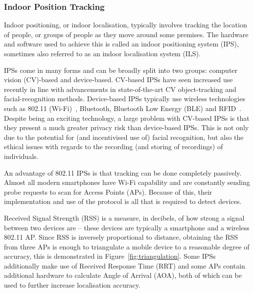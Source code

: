 \subsubsection{Indoor Position Tracking}\label{sec:indoor-position-tracking}

Indoor positioning, or indoor localisation, typically involves tracking the location of people, or groups of people as they move around some premises.
The hardware and software used to achieve this is called an indoor positioning system (IPS), sometimes also referred to as an indoor localisation system (ILS).

IPSs come in many forms and can be broadly split into two groups: computer vision (CV)-based and device-based.
CV-based IPSs have seen increased use recently in line with advancements in state-of-the-art CV object-tracking and facial-recognition methods.
Device-based IPSs typically use wireless technologies such as 802.11 (Wi-Fi)~\cite{ieee1997}, Bluetooth, Bluetooth Low Energy (BLE) and RFID~\cite{S.Shen2020}.
Despite being an exciting technology, a large problem with CV-based IPSs is that they present a much greater privacy risk than device-based IPSs.
This is not only due to the potential for (and incentivised use of) facial recognition, but also the ethical issues with regards to the recording (and storing of recordings) of individuals.

An advantage of 802.11 IPSs is that tracking can be done completely passively.
Almost all modern smartphones have Wi-Fi capability and are constantly sending probe requests to scan for Access Points (APs).
Because of this, their implementation and use of the protocol is all that is required to detect devices.

Received Signal Strength (RSS) is a measure, in decibels, of how strong a signal between two devices are -- these devices are typically a smartphone and a wireless 802.11 AP.
Since RSS is inversely proportional to distance, obtaining the RSS from three APs is enough to triangulate a mobile device to a reasonable degree of accuracy, this is demonstrated in Figure~\ref{fig:triangulation}.
Some IPSs additionally make use of Received Response Time (RRT) and some APs contain additional hardware to calculate Angle of Arrival (AOA), both of which can be used to further increase localisation accuracy.

